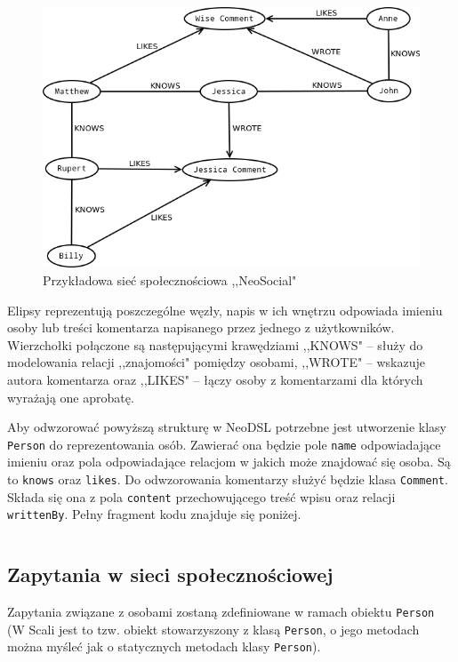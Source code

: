 \documentclass[brudnopis]{xmgr}
\begin{document}
\begin{figure}[H]
	\includegraphics[scale=0.5]{images/socialnetwork-data.png}
	\caption{Przykładowa sieć społecznościowa ,,NeoSocial"}
	\label{fig:neosocial_data}
\end{figure}

Elipsy reprezentują poszczególne węzły, napis w ich wnętrzu odpowiada imieniu osoby lub treści komentarza napisanego przez jednego z użytkowników. Wierzchołki połączone są następującymi krawędziami  ,,KNOWS" -- służy do modelowania relacji ,,znajomości" pomiędzy osobami, ,,WROTE" -- wskazuje autora komentarza oraz ,,LIKES" -- łączy osoby z komentarzami dla których wyrażają one aprobatę.

Aby odwzorować powyższą strukturę w NeoDSL potrzebne jest utworzenie klasy \texttt{Person} do reprezentowania osób. Zawierać ona będzie pole \texttt{name} odpowiadające imieniu oraz pola odpowiadające relacjom w jakich może znajdować się osoba. Są to \texttt{knows} oraz \texttt{likes}. Do odwzorowania komentarzy służyć będzie klasa \texttt{Comment}. Składa się ona z pola \texttt{content} przechowującego treść wpisu oraz relacji \texttt{writtenBy}. Pełny fragment kodu znajduje się poniżej.

\inputminted{scala}{listings/scala/examples/socialnetwork/domain-classes.scala}

\subsection{Zapytania w sieci społecznościowej}

Zapytania związane z osobami zostaną zdefiniowane w ramach obiektu \texttt{Person} (W Scali jest to tzw. obiekt stowarzyszony z klasą \texttt{Person}, o jego metodach można myśleć jak o statycznych metodach klasy \texttt{Person}).
\end{document}
